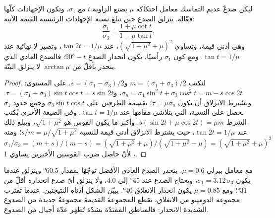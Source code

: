 \begin{proposition}\label{prop:b3:extension-strike-slip:lockup}
ليكن صدعٌ عديم التماسك معامل احتكاكه $\mu$ يصنع الزاوية
$t$ مع $\sigma_1$، وتكون الإجهادات كلّها فعّالة. ينزلق الصدع حين تبلغ نسبة
الإجهادات الرئيسية القيمة الآتية:
\[
  \frac{\sigma_1}{\sigma_3} = \frac{1 + \mu\cot t}{1 - \mu\tan t} ,
\]
وهي أدنى قيمة، وتساوي $(\sqrt{1 + \mu^2} + \mu)^2$، عند $\tan2t = 1/\mu$، وتصير
لا نهائية عند $\tan t = 1/\mu$. ومع كون $\sigma_1$ رأسيًا، يكون انحدار الصدع
$\ang{90} - t$: فالصدع العادي الذي ينحدر بأقلّ من $\arctan\mu$ لا ينزلق
البتّة.
\end{proposition}

\begin{proof}
لنكتب $m = (\sigma_1 + \sigma_3)/2$ و$s = (\sigma_1 - \sigma_3)/2$. على
المستوى: $\sigma_n = \sigma_1\sin^2t + \sigma_3\cos^2t = m - s\cos2t$،
و$\tau = (\sigma_1 - \sigma_3)\sin t\cos t = s\sin2t$. ويشترط الانزلاق أن يكون $\tau =
\mu\sigma_n$؛ بقسمة الطرفين على $\sigma_3\sin t\cos t$ وجمع حدود $\sigma_1$
نحصل على النسبة، التي يتلاشى مقامها عند $\tan t = 1/\mu$. وفي الصيغة
الأخرى يُكتب الشرط $s(\sin2t + \mu\cos2t) = \mu m$. وأكبر ما يكون القوس
هو $\sqrt{1 + \mu^2}$، ويبلغ ذلك عند $\tan2t = 1/\mu$، حيث يشترط الانزلاق أدنى
قيمة للنسبة $s/m = \mu/\sqrt{1 + \mu^2}$؛ ومنه $\sigma_1/\sigma_3 = (m + s)/(m - s) =
(\sqrt{1 + \mu^2} + \mu)/(\sqrt{1 + \mu^2} - \mu) = (\sqrt{1 + \mu^2} +
\mu)^2$، لأنّ حاصل ضرب القوسين الأخيرين يساوي 1.
\end{proof}

مع معامل بيرلي $\mu = 0.6$، ينحدر الصدع العادي الأفضل توجّهًا بمقدار \ang{60.5}
وينزلق عندما يكون $\sigma_1 = 3.12\,\sigma_3$، ويحتاج الصدع عند \ang{45} إلى $4.0$،
ولا ينزلق أيّ صدع انحداره أقلّ من \ang{31}؛ ومع $\mu = 0.85$ يكون انحدار الانغلاق
\ang{40}. يبيّن الشكل أدناه النتيجتين. عندما تقترب مجموعة الدومينو
من الانغلاق، تقطع المجموعةَ القديمةَ مجموعةٌ جديدة من الصدوع الشديدة الانحدار:
فالمناطق الممتدّة بشدّة تُظهر عدّة أجيال من الصدوع.

